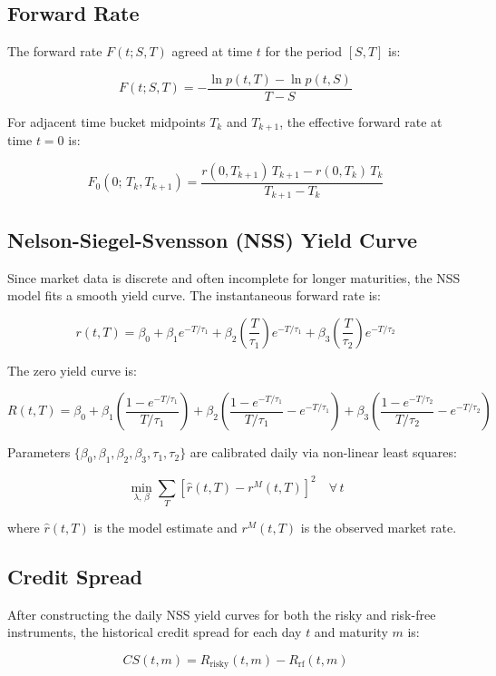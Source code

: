 \documentclass[11pt, a4paper]{article}
\begin{document}
\subsection{Forward Rate}

The forward rate $F(t; S, T)$ agreed at time $t$ for the period $[S, T]$ is:

\[
    F(t; S, T) = -\frac{\ln p(t, T) - \ln p(t, S)}{T - S}
\]

For adjacent time bucket midpoints $T_k$ and $T_{k+1}$, the effective forward rate at time $t=0$ is:

\[
    F_0(0;\, T_k, T_{k+1}) = \frac{r(0, T_{k+1})\,T_{k+1} - r(0, T_k)\,T_k}{T_{k+1} - T_k}
\]

\subsection{Nelson-Siegel-Svensson (NSS) Yield Curve}

Since market data is discrete and often incomplete for longer maturities, the NSS model fits a smooth yield curve. The instantaneous forward rate is:

\[
    r(t, T) = \beta_0 + \beta_1 e^{-T/\tau_1}
    + \beta_2 \left(\frac{T}{\tau_1}\right) e^{-T/\tau_1}
    + \beta_3 \left(\frac{T}{\tau_2}\right) e^{-T/\tau_2}
\]

The zero yield curve is:

\[
    R(t, T) = \beta_0
    + \beta_1 \left(\frac{1 - e^{-T/\tau_1}}{T/\tau_1}\right)
    + \beta_2 \left(\frac{1 - e^{-T/\tau_1}}{T/\tau_1} - e^{-T/\tau_1}\right)
    + \beta_3 \left(\frac{1 - e^{-T/\tau_2}}{T/\tau_2} - e^{-T/\tau_2}\right)
\]

Parameters $\{\beta_0, \beta_1, \beta_2, \beta_3, \tau_1, \tau_2\}$ are calibrated daily via non-linear least squares:

\[
    \min_{\lambda,\,\beta} \sum_T \left[\hat{r}(t, T) - r^M(t, T)\right]^2 \quad \forall\, t
\]

where $\hat{r}(t, T)$ is the model estimate and $r^M(t, T)$ is the observed market rate.

\subsection{Credit Spread}

After constructing the daily NSS yield curves for both the risky and risk-free instruments, the historical credit spread for each day $t$ and maturity $m$ is:

\[
    CS(t, m) = R_{\text{risky}}(t, m) - R_{\text{rf}}(t, m)
\]
\end{document}

